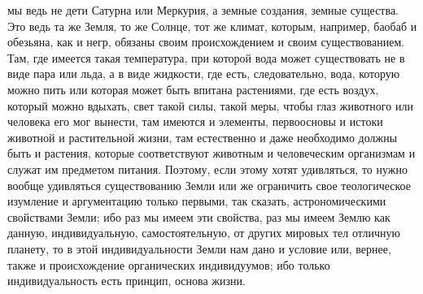 \documentclass[12pt]{article}
\begin{document}
мы ведь не дети Сатурна или Меркурия, а земные создания, земные существа. Это ведь та же Земля, то же Солнце, тот же климат, которым, например, баобаб и обезьяна, как и негр, обязаны своим происхождением и своим существованием. Там, где имеется такая температура, при которой вода может существовать не в виде пара или льда, а в виде жидкости, где есть, следовательно, вода, которую можно пить или которая может быть впитана растениями, где есть воздух, который можно вдыхать, свет такой силы, такой меры, чтобы глаз животного или человека его мог вынести, там имеются и элементы, первоосновы и истоки животной и растительной жизни, там естественно и даже необходимо должны быть и растения, которые соответствуют животным и человеческим организмам и служат им предметом питания. Поэтому, если этому хотят удивляться, то нужно вообще удивляться существованию Земли или же ограничить свое теологическое изумление и аргументацию только первыми, так сказать, астрономическими свойствами Земли; ибо раз мы имеем эти свойства, раз мы имеем Землю как данную, индивидуальную, самостоятельную, от других мировых тел отличную планету, то в этой индивидуальности Земли нам дано и условие или, вернее, также и происхождение органических индивидуумов; ибо только индивидуальность есть принцип, основа жизни. 
\end{document}
